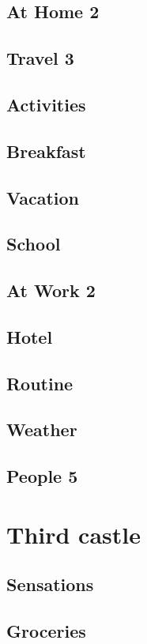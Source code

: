 \documentclass[a4paper,11pt,oneside]{book}
\begin{document}
\section{At Home 2}
\section{Travel 3}
\section{Activities}
\section{Breakfast}
\section{Vacation}
\section{School}
\section{At Work 2}
\section{Hotel}
\section{Routine}
\section{Weather}
\section{People 5}

\chapter{Third castle}

\section{Sensations}
\section{Groceries}
\end{document}
